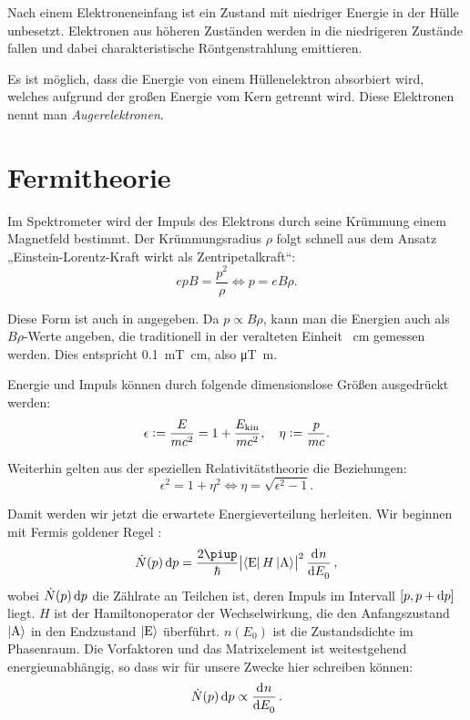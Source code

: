 \documentclass[11pt, ngerman, fleqn, DIV=15, headinclude, BCOR=2cm]{scrreprt}
\begin{document}
Nach einem Elektroneneinfang ist ein Zustand mit niedriger Energie in der Hülle
unbesetzt. Elektronen aus höheren Zuständen werden in die niedrigeren Zustände
fallen und dabei charakteristische Röntgenstrahlung emittieren.

Es ist möglich, dass die Energie von einem Hüllenelektron absorbiert
wird, welches aufgrund der großen Energie vom Kern getrennt wird. Diese
Elektronen nennt man \emph{Augerelektronen}.

\section{Fermitheorie}

Im Spektrometer wird der Impuls des Elektrons durch seine Krümmung einem
Magnetfeld bestimmt. Der Krümmungsradius $\rho$ folgt schnell aus dem Ansatz
„Einstein-Lorentz-Kraft wirkt als Zentripetalkraft“:
\[
    epB = \frac{p^2}{\rho}
    \iff
    p = eB\rho.
\]

Diese Form ist auch in \parencite[§2.232]{Riezler/Kernphysikalisches}
angegeben. Da $p \propto B\rho$, kann man die Energien auch als $B\rho$-Werte
angeben, die traditionell in der veralteten Einheit \si{\gauss\centi\meter}
gemessen werden. Dies entspricht \SI{0.1}{\milli\tesla\centi\meter}, also
\si{\micro\tesla\meter}.
    
Energie und Impuls können durch folgende dimensionslose Größen ausgedrückt
werden: \parencite[(132) und (133)]{Riezler/Kernphysikalisches}
\[
    \epsilon := \frac{E}{m c^2} = 1 + \frac{E_\text{kin}}{m c^2}
    ,\quad
    \eta := \frac{p}{m c}.
\]

Weiterhin gelten aus der speziellen Relativitätstheorie die Beziehungen:
\parencite[(134)]{Riezler/Kernphysikalisches}
\[
    \epsilon^2 = 1 + \eta^2
    \iff
    \eta = \sqrt{\epsilon^2 - 1}.
\]

Damit werden wir jetzt die erwartete Energieverteilung herleiten. Wir beginnen
mit Fermis goldener Regel \parencite[Seite~9]{Hof/Poltergeist}:
\[
    \dot N(p) \dif p = \frac{2\piup}{\hbar} \abs{\bra{\text E} H \ket{\text A}}^2 \dod n{E_0},
\]
wobei $\dot N(p) \dif p$ die Zählrate an Teilchen ist, deren Impuls im
Intervall $[p, p + \dif p]$ liegt. $H$ ist der Hamiltonoperator der
Wechselwirkung, die den Anfangszustand $\ket{\text A}$ in den Endzustand
$\ket{\text E}$ überführt. $n(E_0)$ ist die Zustandsdichte im Phasenraum. Die
Vorfaktoren und das Matrixelement ist weitestgehend energieunabhängig, so dass
wir für unsere Zwecke hier schreiben können:
\[
    \dot N(p) \dif p \propto \dod n{E_0}.
\]
\end{document}
